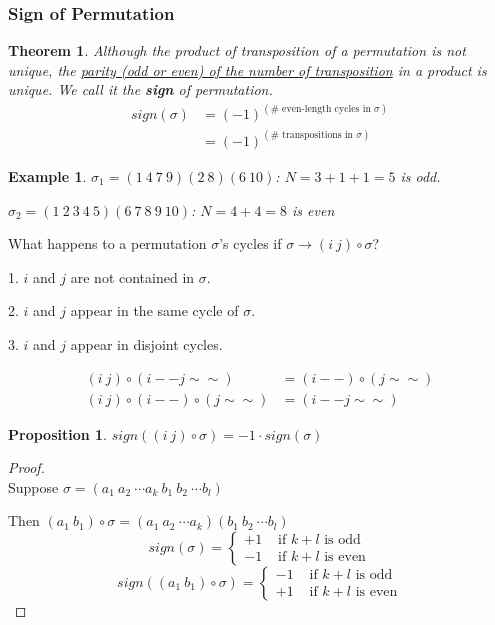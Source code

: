 \documentclass[11pt,a4paper]{article}
\newtheorem{theorem}{Theorem}
\newtheorem{proposition}{Proposition}
\newtheorem{example}{Example}
\begin{document}
\subsubsection{Sign of Permutation}
\begin{theorem}
Although the product of transposition of a permutation is not unique, the \underline{parity (odd or even) of the number of transposition} in a product is unique. We call it the \textbf{sign} of permutation.
\begin{equation}
    \begin{aligned}
        sign(\sigma)&=(-1)^{(\#\text{ even-length cycles in }\sigma)}\\
        &=(-1)^{(\#\text{ transpositions in }\sigma)}
    \end{aligned}
    \nonumber
\end{equation}
\end{theorem}

\begin{example}
\quad

$\sigma_1=(1\ 4\ 7\ 9)(2\ 8)(6\ 10)$: $N=3+1+1=5$ is odd.

$\sigma_2=(1\ 2\ 3\ 4\ 5)(6\ 7\ 8\ 9\ 10)$: $N=4+4=8$ is even
\end{example}

What happens to a permutation $\sigma$'s cycles if $\sigma \rightarrow (i\ j)\circ\sigma$?

1. $i$ and $j$ are not contained in $\sigma$.

2. $i$ and $j$ appear in the same cycle of $\sigma$.

3. $i$ and $j$ appear in disjoint cycles.

\begin{equation}
    \begin{aligned}
        (i\ j)\circ (i-- j\sim\sim)&=(i--)\circ(j\sim\sim)\\
        (i\ j)\circ(i--)\circ(j\sim\sim)&=(i-- j\sim\sim)
    \end{aligned}
    \nonumber
\end{equation}
\begin{proposition}
    $sign((i\ j)\circ\sigma)=-1\cdot sign(\sigma)$
\end{proposition}
\begin{proof}
\quad\\

Suppose $\sigma=(a_1\ a_2\ \cdots a_k\ b_1\ b_2\ \cdots b_l)$

Then $(a_1\ b_1)\circ\sigma=(a_1\ a_2\ \cdots a_k)(b_1\ b_2\ \cdots b_l)$
$$sign(\sigma)=\left\{\begin{matrix}
    +1&\text{ if $k+l$ is odd}\\
    -1&\text{ if $k+l$ is even}
\end{matrix}\right.$$
$$sign((a_1\ b_1)\circ\sigma)=\left\{\begin{matrix}
    -1&\text{ if $k+l$ is odd}\\
    +1&\text{ if $k+l$ is even}
\end{matrix}\right.$$

\end{proof}
\end{document}
